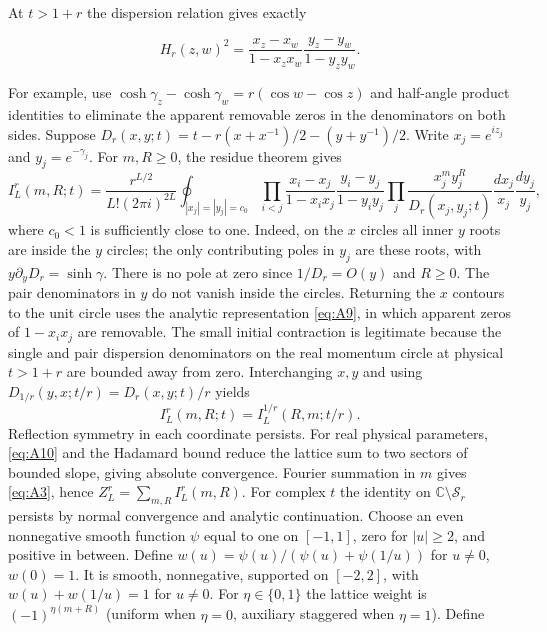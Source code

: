 \documentclass[11pt,a4paper]{article}
\numberwithin{equation}{section}
\theoremstyle{plain}
\theoremstyle{definition}
\begin{document}
At \(t>1+r\) the dispersion relation gives exactly

\begin{equation}
H_r(z,w)^2=\frac{x_z-x_w}{1-x_z x_w}\frac{y_z-y_w}{1-y_z y_w}.
\label{eq:A9}
\end{equation}

For example, use \(\cosh\gamma_z-\cosh\gamma_w=r(\cos w-\cos z)\) and half-angle product identities to eliminate the apparent removable zeros in the denominators on both sides. Suppose \(D_r(x,y;t)=t-r(x+x^{-1})/2-(y+y^{-1})/2\). Write $x_j=e^{iz_j}$ and $y_j=e^{-\gamma_j}$. For $m,R\ge0$, the residue theorem gives
\begin{equation}
 I_L^r(m,R;t)=\frac{r^{L/2}}{L!(2\pi i)^{2L}}\oint_{|x_j|=|y_j|=c_0}
 \prod_{i<j}\frac{x_i-x_j}{1-x_ix_j}\frac{y_i-y_j}{1-y_iy_j}
 \prod_j\frac{x_j^m y_j^R}{D_r(x_j,y_j;t)}\frac{dx_j}{x_j}\frac{dy_j}{y_j},\label{eq:residueinterchange}
\end{equation}
where $c_0<1$ is sufficiently close to one. Indeed, on the $x$ circles all inner $y$ roots are inside the $y$ circles; the only contributing poles in $y_j$ are these roots, with $y\partial_yD_r=\sinh\gamma$. There is no pole at zero since $1/D_r=O(y)$ and $R\ge0$. The pair denominators in $y$ do not vanish inside the circles. Returning the $x$ contours to the unit circle uses the analytic representation \eqref{eq:A9}, in which apparent zeros of $1-x_ix_j$ are removable. The small initial contraction is legitimate because the single and pair dispersion denominators on the real momentum circle at physical $t>1+r$ are bounded away from zero. Interchanging $x,y$ and using $D_{1/r}(y,x;t/r)=D_r(x,y;t)/r$ yields
\begin{equation}
 I_L^r(m,R;t)=I_L^{1/r}(R,m;t/r).\label{eq:A10}
\end{equation}
Reflection symmetry in each coordinate persists. For real physical parameters, \eqref{eq:A10} and the Hadamard bound reduce the lattice sum to two sectors of bounded slope, giving absolute convergence. Fourier summation in \(m\) gives \eqref{eq:A3}, hence \(Z_L^r=\sum_{m,R}I_L^r(m,R)\). For complex \(t\) the identity on \(\mathbb C\setminus\mathcal S_r\) persists by normal convergence and analytic continuation. Choose an even nonnegative smooth function $\psi$ equal to one on $[-1,1]$, zero for $|u|\ge2$, and positive in between. Define $w(u)=\psi(u)/(\psi(u)+\psi(1/u))$ for $u\ne0$, $w(0)=1$. It is smooth, nonnegative, supported on $[-2,2]$, with $w(u)+w(1/u)=1$ for $u\ne0$. For $\eta\in\{0,1\}$ the lattice weight is $(-1)^{\eta(m+R)}$ (uniform when $\eta=0$, auxiliary staggered when $\eta=1$). Define
\end{document}
